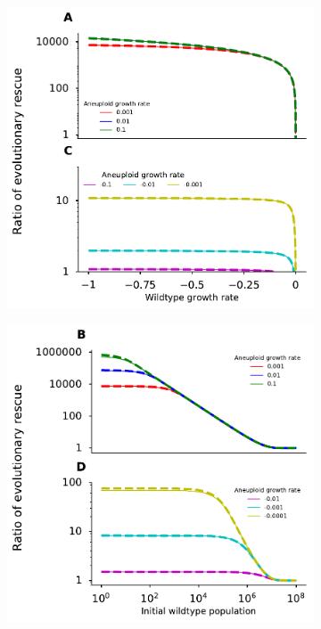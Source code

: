 \documentclass[12pt]{extarticle}
\begin{document}
\begin{figure}
\begin{subfigure}{0.5\textwidth}
\includegraphics[width=1\textwidth]{Figures/RatioEvolRescue.pdf}
\end{subfigure}
\begin{subfigure}{0.5\textwidth}
\includegraphics[width=1\textwidth]{Figures/RatioEvolRescuePopulationSize.pdf}

\end{subfigure}
\end{figure}
\end{document}
